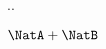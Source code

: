 \documentclass{article}
\begin{document}
    \tiny

    ..



    \ExplSyntaxOn
    \ExplSyntaxOff









    \begin{math}
        \NatA + \NatB
    \end{math} 
\end{document}
